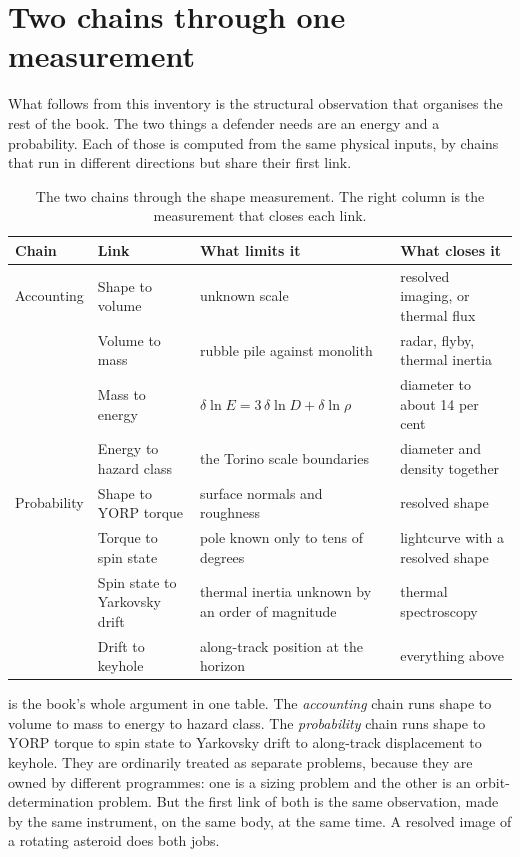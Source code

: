 \section{Two chains through one measurement}

What follows from this inventory is the structural observation that organises
the rest of the book. The two things a defender needs are an energy and a
probability. Each of those is computed from the same physical inputs, by
chains that run in different directions but share their first link.

\begin{table}[!htbp]
\centering
\footnotesize
\caption{The two chains through the shape measurement. The right column is the
measurement that closes each link.}
\label{tab:chains}
\begin{tabularx}{\textwidth}{@{}P{0.64in}P{1.08in}YY@{}}
\toprule
{}
\textbf{Chain} & \textbf{Link} & \textbf{What limits it} & \textbf{What closes it} \\
\midrule
Accounting & Shape to volume & unknown scale & resolved imaging, or thermal flux \\
 & Volume to mass & rubble pile against monolith & radar, flyby, thermal inertia \\
 & Mass to energy & \(\delta\ln E = 3\,\delta\ln D + \delta\ln \rho\) &
 diameter to about 14 per cent \\
 & Energy to hazard class & the Torino scale boundaries &
 diameter and density together \\
Probability & Shape to YORP torque & surface normals and roughness &
 resolved shape \\
 & Torque to spin state & pole known only to tens of degrees &
 lightcurve with a resolved shape \\
 & Spin state to Yarkovsky drift & thermal inertia unknown by an order of
 magnitude & thermal spectroscopy \\
 & Drift to keyhole & along-track position at the horizon &
 everything above \\
\bottomrule
\end{tabularx}
\end{table}

 is the book's whole argument in one table. The
\emph{accounting} chain runs shape to volume to mass to energy to hazard
class. The \emph{probability} chain runs shape to YORP torque to spin state to
Yarkovsky drift to along-track displacement to keyhole. They are ordinarily
treated as separate problems, because they are owned by different programmes:
one is a sizing problem and the other is an orbit-determination problem. But
the first link of both is the same observation, made by the same instrument,
on the same body, at the same time. A resolved image of a rotating asteroid
does both jobs.

